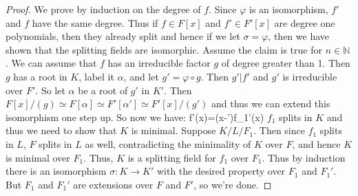         \begin{proof}
            We prove by induction on the degree of $f$. Since $\varphi$ is
            an isomorphism, $f'$ and $f$ have the same degree. Thus if
            $f\in{F}[x]$ and $f'\in{F}'[x]$ are degree one polynomials, then
            they already split and hence if we let $\sigma=\varphi$, then
            we have shown that the splitting fields are isomorphic. Assume
            the claim is true for $n\in\mathbb{N}$. We can assume that $f$
            has an irreducible factor $g$ of degree greater than 1. Then
            $g$ has a root in $K$, label it $\alpha$, and let
            $g'=\varphi\circ{g}$. Then $g'|f'$ and $g'$ is irreducible
            over $F'$. So let $\alpha$ be a root of $g'$ in $K'$. Then
            $F[x]/(g)\simeq{F}[\alpha]\simeq{F}'[\alpha']\simeq{F}'[x]/(g')$
            and thus we can extend this isomorphism one step up. So now we
            have:
                        {f'(x)=(x-\alpha')f_{1}'(x)}
            $f_{1}$ splits in $K$ and thus we need to show that $K$ is
            minimal. Suppose $K/L/F_{1}$. Then since $f_{1}$ splits in $L$,
            $F$ splits in $L$ as well, contradicting the minimality of $K$
            over $F$, and hence $K$ is minimal over $F_{1}$. Thus, $K$ is
            a splitting field for $f_{1}$ over $F_{1}$. Thus by induction
            there is an isomorphism $\sigma:K\rightarrow{K}'$ with the
            desired property over $F_{1}$ and $F_{1}'$. But $F_{1}$ and
            $F_{1}'$ are extensions over $F$ and $F'$, so we're done.
        \end{proof}
